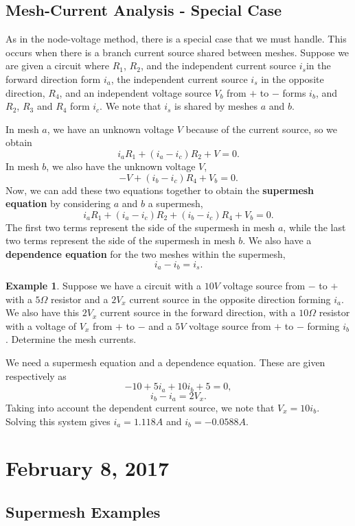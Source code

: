 \documentclass[11pt]{article}
\theoremstyle{plain} %
\theoremstyle{definition}
\theoremstyle{example}
\newtheorem*{example}{Example}
\theoremstyle{remark}
\begin{document}
\subsection{Mesh-Current Analysis - Special Case}

As in the node-voltage method, there is a special case that we must handle. This occurs when there is a branch current source shared between meshes. Suppose we are given a circuit where $R_1$, $R_2$, and the independent current source $i_s$in the forward direction form $i_a$, the independent current source $i_s$ in the opposite direction, $R_4$, and an independent voltage source $V_b$ from $+$ to $-$ forms $i_b$, and $R_2$, $R_3$ and $R_4$ form $i_c$. We note that $i_s$ is shared by meshes $a$ and $b$. 

In mesh $a$, we have an unknown voltage $V$ because of the current source, so we obtain 
$$i_aR_1 + (i_a-i_c)R_2 + V = 0.$$
In mesh $b$, we also have the unknown voltage $V$, 
$$-V + (i_b-i_c)R_4 + V_b = 0.$$
Now, we can add these two equations together to obtain the \textbf{supermesh equation} by considering $a$ and $b$ a supermesh,
$$i_aR_1 + (i_a-i_c)R_2 + (i_b-i_c)R_4 + V_b = 0.$$
The first two terms represent the side of the supermesh in mesh $a$, while the last two terms represent the side of the supermesh in mesh $b$. We also have a \textbf{dependence equation} for the two meshes within the supermesh,
$$i_a-i_b =i_s.$$

\begin{example}
Suppose we have a circuit with a $10V$ voltage source from $-$ to $+$ with a $5\Omega$ resistor and a $2V_x$ current source in the opposite direction forming $i_a$. We also have this $2V_x$ current source in the forward direction, with a $10\Omega$ resistor with a voltage of $V_x$ from $+$ to $-$ and a $5V$ voltage source from $+$ to $-$ forming $i_b$. Determine the mesh currents. 
\end{example}

We need a supermesh equation and a dependence equation. These are given respectively as
$$-10+5i_a + 10i_b + 5  = 0,$$
$$i_b-i_a = 2V_x.$$
Taking into account the dependent current source, we note that $V_x = 10i_b$. Solving this system gives $i_a = 1.118A$ and $i_b = -0.0588A$. 

\section{February 8, 2017}
\subsection{Supermesh Examples}
\end{document}
